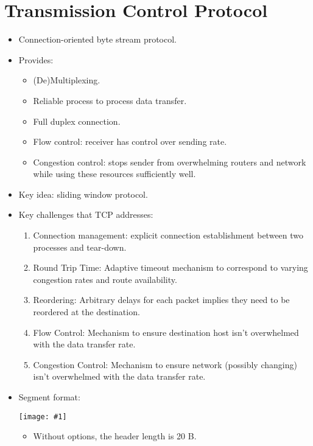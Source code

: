 \documentclass{report}
\makeatletter
\def\maxwidth#1{\ifdim\Gin@nat@width>#1 #1\else\Gin@nat@width\fi}
\newcommand{\mygraphic}[1]{
\begin{center}
    \texttt{[image: \#1]}
\end{center}
}
\makeatother
\begin{document}
\section{Transmission Control Protocol}
\label{sec:tcp}
\begin{itemize}
\item Connection-oriented byte stream protocol.
\item Provides:
\begin{itemize}
    \item (De)Multiplexing.
    \item Reliable process to process data transfer.
    \item Full duplex connection.
    \item Flow control: receiver has control over sending rate.
    \item Congestion control: stops sender from overwhelming routers and network while using these resources sufficiently well.
\end{itemize}
\item Key idea: sliding window protocol.
\item Key challenges that TCP addresses:
\begin{enumerate}
\item Connection management: explicit connection establishment between two processes and tear-down.
\item Round Trip Time: Adaptive timeout mechanism to correspond to varying congestion rates and route availability.
\item Reordering: Arbitrary delays for each packet implies they need to be reordered at the destination.
\item Flow Control: Mechanism to ensure destination host isn't overwhelmed with the data transfer rate.
\item Congestion Control: Mechanism to ensure network (possibly changing) isn't overwhelmed with the data transfer rate.
\end{enumerate}
\item Segment format:
\mygraphic{rsrc/tcppacket.png}
\begin{itemize}
\item Without options, the header length is 20 B.

\end{itemize}
\end{itemize}
\end{document}
